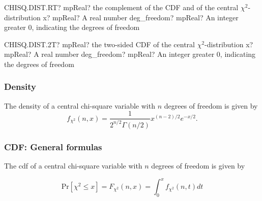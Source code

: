 \vspace{0.6cm}
\begin{mpFunctionsExtract}
	\mpWorksheetFunctionTwoNotImplemented
	{CHISQ.DIST.RT? mpReal? the complement of the CDF and of the central $\chi^2$-distribution}
	{x? mpReal? A real number}
	{deg\_freedom? mpReal? An integer  greater 0, indicating the degrees of freedom}
\end{mpFunctionsExtract}

\vspace{0.6cm}
\begin{mpFunctionsExtract}
	\mpWorksheetFunctionTwoNotImplemented
	{CHISQ.DIST.2T? mpReal? the two-sided CDF of the central $\chi^2$-distribution}
	{x? mpReal? A real number}
	{deg\_freedom? mpReal? An integer  greater 0, indicating the degrees of freedom}
\end{mpFunctionsExtract}









\subsubsection{Density}
\label{ChiSquareDistributionDensity}
The density of a central chi-square variable with $n$ degrees of freedom is given by
\begin{equation}
	f_{\chi^2}(n, x)  = \frac{1}{2^{n/2} \Gamma(n/2)} x^{(n-2)/2}e^{-x/2}.
\end{equation}

\subsubsection{CDF: General formulas}
\label{sec:ChiSquareDistribution_cdf}

%
The cdf of a central chi-square variable with $n$ degrees of freedom is given by

\begin{equation}
	\text{Pr}\left[\chi^2 \le x\right] = F_{\chi^2}\left(n, x\right) =  \int_{0}^{x} f_{\chi^2}(n, t) dt
\end{equation}


